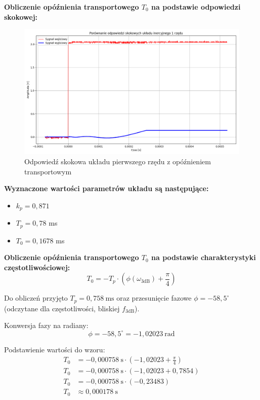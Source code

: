 \documentclass[12pt,a4paper]{article}
\begin{document}
	\textbf{Obliczenie opóźnienia transportowego $T_0$ na podstawie odpowiedzi skokowej:}
	\begin{figure}[H]
		\centering
		\includegraphics[width=1\linewidth]{zdjecia/odp_skok_z_opz.png}
		\caption{Odpowiedź skokowa układu pierwszego rzędu z opóźnieniem transportowym}
		\label{fig:odp_skok_z_opz}
	\end{figure}
	
	\textbf{Wyznaczone wartości parametrów układu są następujące:}
	\begin{itemize}
		\item $k_p = 0{,}871$
		\item $T_p = 0{,}78$ ms
		\item $T_0 = 0{,}1678$ ms
	\end{itemize}
	
	\textbf{Obliczenie opóźnienia transportowego $T_0$ na podstawie charakterystyki częstotliwościowej:}
	\begin{equation}
		T_0 = -T_p \cdot \left( \phi(\omega_{3\text{dB}}) + \frac{\pi}{4} \right)
	\end{equation}
	
	Do obliczeń przyjęto $T_p = 0{,}758~\text{ms}$ oraz przesunięcie fazowe $\phi = -58{,}5^{\circ}$ (odczytane dla częstotliwości, bliskiej $f_{3\text{dB}}$).
	
	Konwersja fazy na radiany:
	\[
	\phi = -58{,}5^{\circ} = -1{,}02023~\text{rad}
	\]
	
	Podstawienie wartości do wzoru:
	\begin{align*}
		T_0 &= -0{,}000758~\text{s} \cdot \left( -1{,}02023 + \frac{\pi}{4} \right) \\
		T_0 &= -0{,}000758~\text{s} \cdot \left( -1{,}02023 + 0{,}7854 \right) \\
		T_0 &= -0{,}000758~\text{s} \cdot (-0{,}23483) \\
		T_0 &\approx 0{,}000178~\text{s}
	\end{align*}
	
\end{document}
